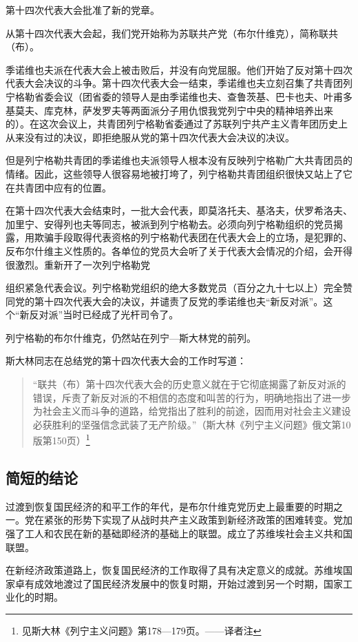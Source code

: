 第十四次代表大会批准了新的党章。

从第十四次代表大会起，我们党开始称为苏联共产党（布尔什维克），简称联共（布）。

季诺维也夫派在代表大会上被击败后，并没有向党屈服。他们开始了反对第十四次代表大会决议的斗争。第十四次代表大会一结束，季诺维也夫立刻召集了共青团列宁格勒省委会议（团省委的领导人是由季诺维也夫、查鲁茨基、巴卡也夫、叶甫多基莫夫、库克林，萨发罗夫等两面派分子用仇恨我党列宁中央的精神培养出来的）。在这次会议上，共青团列宁格勒省委通过了苏联列宁共产主义青年团历史上从来没有过的决议，即拒绝服从党的第十四次代表大会决议的决议。

但是列宁格勒共青团的季诺维也夫派领导人根本没有反映列宁格勒广大共青团员的情绪。因此，这些领导人很容易地被打垮了，列宁格勒共青团组织很快又站上了它在共青团中应有的位置。

在第十四次代表大会结束时，一批大会代表，即莫洛托夫、基洛夫，伏罗希洛夫、加里宁、安得列也夫等同志，被派到列宁格勒去。必须向列宁格勒组织的党员揭露，用欺骗手段取得代表资格的列宁格勒代表团在代表大会上的立场，是犯罪的、反布尔什维主义性质的。各单位的党员大会听了关于代表大会情况的介绍，会开得很激烈。重新开了一次列宁格勒党

组织紧急代表会议。列宁格勒党组织的绝大多数党员（百分之九十七以上）完全赞同党的第十四次代表大会的决议，并谴责了反党的季诺维也夫“新反对派”。这个“新反对派”当时已经成了光杆司令了。

列宁格勒的布尔什维克，仍然站在列宁—斯大林党的前列。

斯大林同志在总结党的第十四次代表大会的工作时写道：

\begin{quotation}
“联共（布）第十四次代表大会的历史意义就在于它彻底揭露了新反对派的错误，斥责了新反对派的不相信的态度和叫苦的行为，明确地指出了进一步为社会主义而斗争的道路，给党指出了胜利的前途，因而用对社会主义建设必获胜利的坚强信念武装了无产阶级。”（斯大林《列宁主义问题》俄文第10版第150页）\footnote{见斯大林《列宁主义问题》第178—179页。——译者注}
\end{quotation}


\subsection{简短的结论}

过渡到恢复国民经济的和平工作的年代，是布尔什维克党历史上最重要的时期之一。党在紧张的形势下实现了从战时共产主义政策到新经济政策的困难转变。党加强了工人和农民在新的基础即经济的基础上的联盟。成立了苏维埃社会主义共和国联盟。

在新经济政策道路上，恢复国民经济的工作取得了具有决定意义的成就。苏维埃国家卓有成效地渡过了国民经济发展中的恢复时期，开始过渡到另一个时期，国家工业化的时期。

